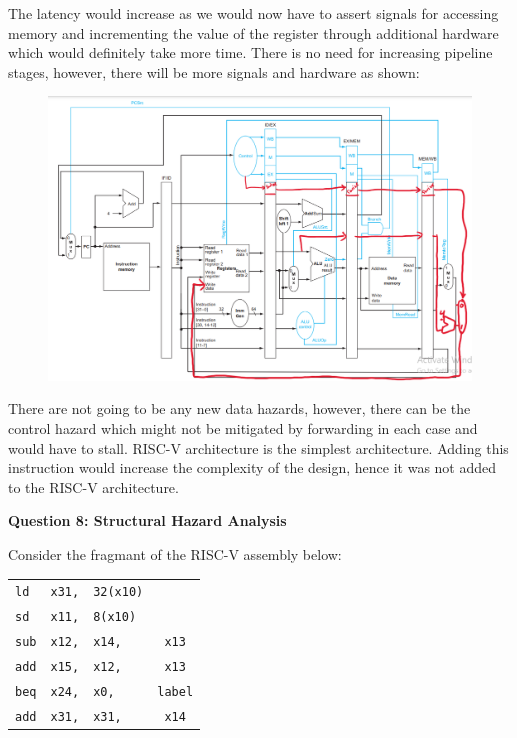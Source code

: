 \documentclass[addpoints]{exam}
\begin{document}
\begin{sloppypar}
\begin{questions}
\begin{solution}
\begin{parts}
\begin{subparts}
                \subpart The latency would increase as we would now have to assert signals for accessing memory and incrementing the value of the register through additional hardware which would definitely take more time.
                \subpart There is no need for increasing pipeline stages, however, there will be more signals and hardware as shown:
                \begin{figure}[H]
                    \centering
                    \includegraphics[scale = 0.5]{Q7_d_swinc.png}
                \end{figure}

                \subpart There are not going to be any new data hazards, however, there can be the control hazard which might not be mitigated by forwarding in each case and would have to stall.
                \subpart RISC-V architecture is the simplest architecture. Adding this instruction would increase the complexity of the design, hence it was not added to the RISC-V architecture. 
            \end{subparts}
        \end{parts}
    \end{solution}
    \pagebreak
    \question[5]
    \begin{center}
        \textbf{Question 8: Structural Hazard Analysis}
    \end{center}

    Consider the fragmant of the RISC-V assembly below:

    \begin{tabular}{l c l c}
        \texttt{ld} & \texttt{x31,} & \texttt{32(x10)} & \\ 
        \texttt{sd} & \texttt{x11,} & \texttt{8(x10)} & \\
        \texttt{sub} & \texttt{x12,} & \texttt{x14,} & \texttt{x13} \\ 
        \texttt{add} & \texttt{x15,} & \texttt{x12,} & \texttt{x13} \\ 
        \texttt{beq} & \texttt{x24,} & \texttt{x0,} & \texttt{label} \\ 
        \texttt{add} & \texttt{x31,} & \texttt{x31,} & \texttt{x14}
    \end{tabular}


\end{questions}
\end{sloppypar}
\end{document}
